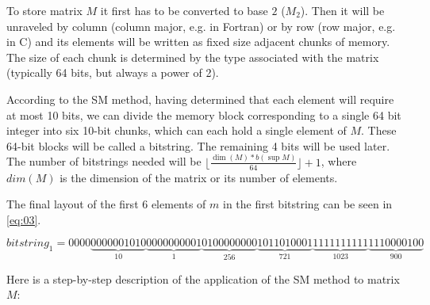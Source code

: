 \documentclass[10pt]{article}
\begin{document}
To store matrix $M$ it first has to be converted to base $2$ ($M_2$). Then it 
will be unraveled by column (column major, e.g. in Fortran) or by row (row 
major, e.g. in C) and its elements will be written as fixed size adjacent chunks 
of memory. The size of each chunk is determined by the type associated with the 
matrix (typically 64 bits, but always a power of 2).

According to the SM method, having determined that each element will require at 
most 10 bits, we can divide the memory block corresponding to a single 64 bit 
integer into six 10-bit chunks, which can each hold a single element of $M$. 
These 64-bit blocks will be called a bitstring. The remaining 4 bits will be 
used later. The number of bitstrings needed will be $\lfloor \frac{\dim(M) 
*b(\sup M)} {64} \rfloor +1$, where $dim(M)$ is the dimension of the matrix or 
its number of elements.

The final layout of the first 6 elements of $m$ in the first bitstring can be 
seen in \ref{eq:03}. 

\begin{equation}\label{eq:03}
 bitstring_1 = 0000\underbrace{0000001010}_{10}\underbrace{0000000001}_{1}\underbrace{0100000000}_{256}\underbrace{1011010001}_{721}\underbrace{1111111111}_{1023}\underbrace{1110000100}_{900} 
\end{equation}

Here is a step-by-step description of the application of the SM method to matrix $M$:
\end{document}
